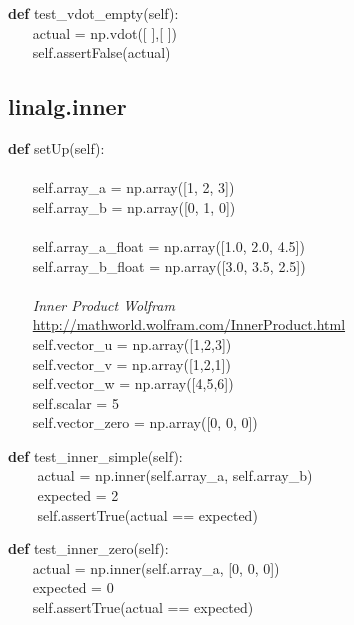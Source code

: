 \documentclass[a4paper,11pt]{article}
\begin{document}
\begin{algorithm}[H]
    \textbf{def} test\_vdot\_empty(self):
\\ $ ~~~~~~~~ $actual = np.vdot([ ],[ ])
\\ $ ~~~~~~~~ $self.assertFalse(actual)
\end{algorithm}

\subsection{linalg.inner}

\begin{algorithm}[H]
    \textbf{def} setUp(self):
\\
\\ $ ~~~~~~~~ $self.array\_a = np.array([1, 2, 3])
\\ $ ~~~~~~~~ $self.array\_b = np.array([0, 1, 0])
\\
\\ $ ~~~~~~~~ $self.array\_a\_float = np.array([1.0, 2.0, 4.5])
\\ $ ~~~~~~~~ $self.array\_b\_float = np.array([3.0, 3.5, 2.5])
\\
\\ $ ~~~~~~~~ $\textit{Inner Product Wolfram} \\$ ~~~~~~~~ $\url{http://mathworld.wolfram.com/InnerProduct.html}
\\ $ ~~~~~~~~ $self.vector\_u = np.array([1,2,3])
\\ $ ~~~~~~~~ $self.vector\_v = np.array([1,2,1])
\\ $ ~~~~~~~~ $self.vector\_w = np.array([4,5,6])
\\ $ ~~~~~~~~ $self.scalar = 5
\\ $ ~~~~~~~~ $self.vector\_zero = np.array([0, 0, 0])
\end{algorithm}


\begin{algorithm}[H]
	\textbf{def} test\_inner\_simple(self):
\\ $ ~~~~~~~~ $	actual = np.inner(self.array\_a, self.array\_b)
\\ $ ~~~~~~~~ $	expected = 2
\\ $ ~~~~~~~~ $	self.assertTrue(actual == expected)
\end{algorithm}

\begin{algorithm}[H]
    \textbf{def} test\_inner\_zero(self):
\\ $ ~~~~~~~~ $actual = np.inner(self.array\_a, [0, 0, 0])
\\ $ ~~~~~~~~ $expected = 0
\\ $ ~~~~~~~~ $self.assertTrue(actual == expected)
\end{algorithm}
\end{document}
